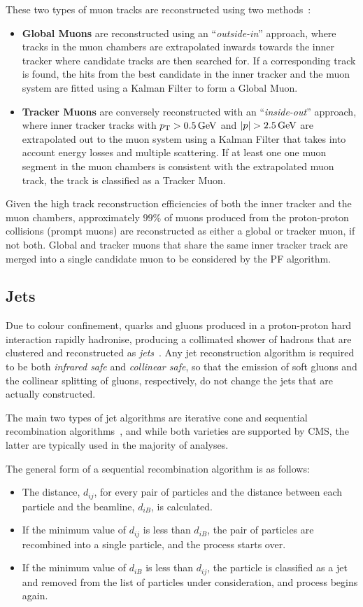 These two types of muon tracks are reconstructed using two methods~\cite{Chatrchyan:2012xi}:
\begin{itemize}
\item \textbf{Global Muons} are reconstructed using an ``\emph{outside-in}'' approach, where tracks in the muon chambers are extrapolated inwards towards the inner tracker where candidate tracks are then searched for.
If a corresponding track is found, the hits from the best candidate in the inner tracker and the muon system are fitted using a Kalman Filter to form a Global Muon.
\item \textbf{Tracker Muons} are conversely reconstructed with an ``\emph{inside-out}'' approach, where inner tracker tracks with $p_{\mathrm{T}} > 0.5\,\text{Ge\hspace{-.08em}V}$ and $|p| > 2.5\,\text{Ge\hspace{-.08em}V}$ are extrapolated out to the muon system using a Kalman Filter that takes into account energy losses and multiple scattering.
If at least one one muon segment in the muon chambers is consistent with the extrapolated muon track, the track is classified as a Tracker Muon.
\end{itemize}

Given the high track reconstruction efficiencies of both the inner tracker and the muon chambers, approximately $99\%$ of muons produced from the proton-proton collisions (prompt muons) are reconstructed as either a global or tracker muon, if not both.
Global and tracker muons that share the same inner tracker track are merged into a single candidate muon to be considered by the PF algorithm.

\subsection{Jets}\label{subsec:objReco-jets}
Due to colour confinement, quarks and gluons produced in a proton-proton hard interaction rapidly hadronise, producing a collimated shower of hadrons that are clustered and reconstructed as \emph{jets}~\cite{Salam:2009jx}.
Any jet reconstruction algorithm is required to be both \emph{infrared safe} and \emph{collinear safe}, \ie so that the emission of soft gluons and the collinear splitting of gluons, respectively, do not change the jets that are actually constructed.

The main two types of jet algorithms are iterative cone and sequential recombination algorithms~\cite{Salam:2009jx}, and while both varieties are supported by CMS, the latter are typically used in the majority of analyses.

The general form of a sequential recombination algorithm is as follows:
\begin{itemize}
\item The distance, $d_{ij}$, for every pair of particles and the distance between each particle and the beamline, $d_{iB}$, is calculated.
\item If the minimum value of $d_{ij}$ is less than $d_{iB}$, the pair of particles are recombined into a single particle, and the process starts over.
\item If the minimum value of $d_{iB}$ is less than $d_{ij}$, the particle is classified as a jet and removed from the list of particles under consideration, and process begins again.
\end{itemize}

